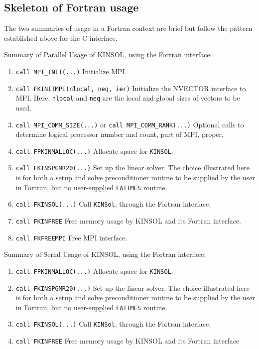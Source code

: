 \subsection{Skeleton of Fortran usage}

The two summaries of usage in a Fortran context are brief but follow the
pattern established above for the C interface. 

{Summary of Parallel Usage of KINSOL, using the Fortran interface:} \label{Fparallel}

\begin{enumerate}

\item  {\tt call MPI\_INIT(...)}        Initialize MPI.
\item {\tt call FKINITMPI(nlocal, neq, ier)} Initialize the NVECTOR interface to MPI.
      Here, {\tt nlocal} and {\tt neq} are the local and global sizes of vectors to be used.

\item  {\tt call MPI\_COMM\_SIZE(...)} or {\tt call MPI\_COMM\_RANK(...)} Optional calls to 
	determine logical processor number and count, part of MPI, proper.

\item  {\tt call FPKINMALLOC(...)} Allocate space for {\tt KINSOL}.

\item  {\tt call FKINSPGMR20(...)} Set up the linear solver. The
	choice illustrated here is for both a setup and solve preconditioner 
	routine to be supplied by the user in Fortran, but no user-supplied
	{\tt FATIMES} routine.

\item  {\tt call FKINSOL(...)} Call {\tt KINSol}, through the Fortran interface.

\item  {\tt call FKINFREE}     Free memory usage by KINSOL and its Fortran interface.

\item  {\tt call FKFREEMPI} Free MPI interface.
\end{enumerate}

{Summary of Serial Usage of KINSOL, using the Fortran interface}: \label{Fserial}

\begin{enumerate}

\item  {\tt call FPKINMALLOC(...)} Allocate space for {\tt KINSOL}.

\item  {\tt call FKINSPGMR20(...)} Set up the linear solver. The
	choice illustrated here is for both a setup and solve preconditioner 
	routine to be supplied by the user in Fortran, but no user-supplied
	{\tt FATIMES} routine.

\item  {\tt call FKINSOL(...)} Call {\tt KINSol}, through the Fortran interface.

\item  {\tt call FKINFREE}     Free memory usage by KINSOL and its Fortran 
          interface
\end{enumerate}


